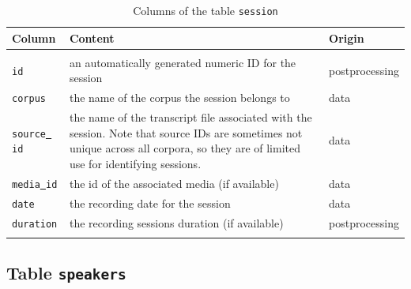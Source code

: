 \documentclass[a4paper, 11pt]{book}
\newcommand{\und}{\underline{{ }}\hspace{0.2mm}}	%
\begin{document}
\begin{longtable}{lp{.5\linewidth}p{.2\linewidth}}
	\toprule
		\textbf{Column} & \textbf{Content} 	& \textbf{Origin} \\
	\midrule
	\endhead
		
	\bottomrule\\[-0.15cm]
	\caption{Columns of the table \texttt{session}}
	\endfoot
	
	
		\texttt{id}				& an automatically generated numeric ID for the session & postprocessing \\
		\texttt{corpus}			& the name of the corpus the session belongs to & data \\
		\texttt{source\und id}	& the name of the transcript file associated with the session. Note that source IDs are sometimes not unique across all corpora, so they are of limited use for identifying sessions. & data \\
		\texttt{media\und id}	& the id of the associated media (if available) & data \\

		\texttt{date} 			& the recording date for the session & data \\ 
		\texttt{duration} 			& the recording sessions duration (if available) & postprocessing \\ 
		\label{tab:Table sessions}
\end{longtable}


\subsection{Table \texttt{speakers}}
\label{subsec:Table speakers}
\end{document}
